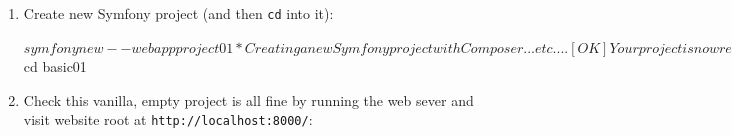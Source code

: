 \documentclass[a4paperpaper,openright]{book}
\newenvironment{Shaded}{}{}
\newcommand{\BuiltInTok}[1]{#1}
\newcommand{\ExtensionTok}[1]{#1}
\newcommand{\NormalTok}[1]{#1}
\begin{document}
\begin{enumerate}
\def\labelenumi{\arabic{enumi}.}
\item
  Create new Symfony project (and then \texttt{cd} into it):

\begin{Shaded}
\begin{Highlighting}[]
\NormalTok{    $ }\ExtensionTok{symfony}\NormalTok{ new --webapp project01}

    \ExtensionTok{*}\NormalTok{ Creating a new Symfony project with Composer}
    \ExtensionTok{...}\NormalTok{ etc. ...}

\NormalTok{    [}\ExtensionTok{OK}\NormalTok{] Your project is now ready in /Users/matt/Documents/Books/php-symfony-6-book/codes/part01/project01}

\NormalTok{    $ }\BuiltInTok{cd}\NormalTok{ basic01}
\end{Highlighting}
\end{Shaded}
\item
  Check this vanilla, empty project is all fine by running the web sever
  and visit website root at \texttt{http://localhost:8000/}:
\end{enumerate}
\end{document}
